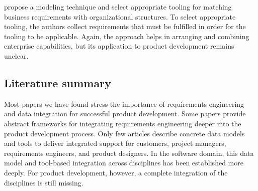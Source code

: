 \cite{9447081} propose a modeling technique and select appropriate tooling for matching business requirements with organizational structures.
To select appropriate tooling, the authors collect requirements that must be fulfilled in order for the tooling to be applicable.
Again, the approach helps in arranging and combining enterprise capabilities, but its application to product development remains unclear.

\subsection{Literature summary}

Most papers we have found stress the importance of requirements engineering and data integration for successful product development.
Some papers provide abstract frameworks for integrating requirements engineering deeper into the product development process.
Only few articles describe concrete data models and tools to deliver  integrated support for customers, project managers, requirements engineers, and product designers.
In the software domain, this data model and tool-based integration across disciplines has been established more deeply.
For product development, however, a complete integration of the disciplines is still missing.